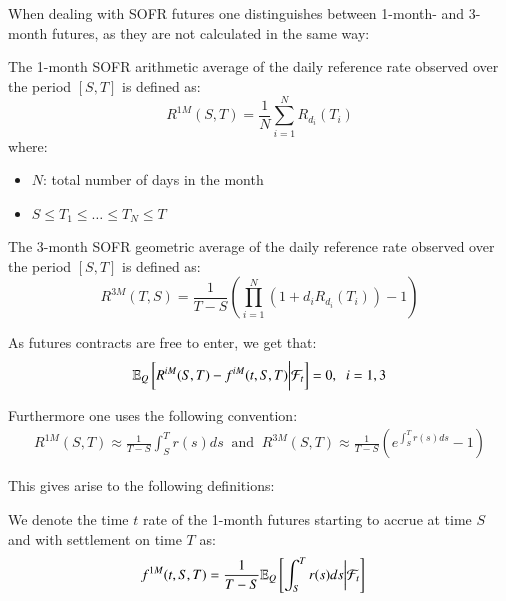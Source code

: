 \newpage 

When dealing with SOFR futures one distinguishes between 1-month- and 3-month futures, as they are not calculated in the same way:

\begin{definition}
The 1-month 
SOFR arithmetic average of the daily reference rate observed over the period $[S,T]$ is defined as: 
\[
R^{1M}(S,T) = \frac{1}{N}\sum_{i=1}^{N}R_{d_{i}}(T_{i})
\]
where:
\begin{itemize}[leftmargin=*]
    \item $N$: total number of days in the month
    \item $S\leq T_{1} \leq \dots \leq T_{N} \leq T$ 
\end{itemize}
\end{definition}

\begin{definition}
The 3-month 
SOFR geometric average of the daily reference rate observed over the period $[S,T]$ is defined as: 
\[
R^{3M}(T,S) = \frac{1}{T-S}\left(
\prod_{i=1}^{N}(1+d_{i}R_{d_{i}}(T_{i})) - 1
\right)
\]
\end{definition}


As futures contracts are free to enter, we get that: 
\begin{align*}
\mathbb{E}_{Q}\left[
R^{iM}(S,T) - f^{iM}(t,S,T)\bigg{|}\mathcal{F}_{t}
\right] = 0, \;\; i = 1,3   
\end{align*}

Furthermore one uses the following convention: 
\begin{align*}
R^{1M}(S,T) \approx  \frac{1}{T-S}\int_{S}^{T}r(s)ds 
\;\;\text{and}\;\;
R^{3M}(S,T) \approx  \frac{1}{T-S}\left(e^{\int_{S}^{T}r(s)ds} -1\right) 
\end{align*}

This gives arise to the following definitions:

\begin{definition}
\label{def: 1M_SOFR_futures}
We denote the time $t$ rate of the 1-month futures starting to accrue at time $S$ and with settlement on time $T$ as:
\begin{align*}
f^{1M}(t,S,T) &= \frac{1}{T-S}\mathbb{E}_{Q}\left[
\int_{S}^{T}r(s)ds\bigg{|}\mathcal{F}_{t}
\right]    
\end{align*}
\end{definition} 

